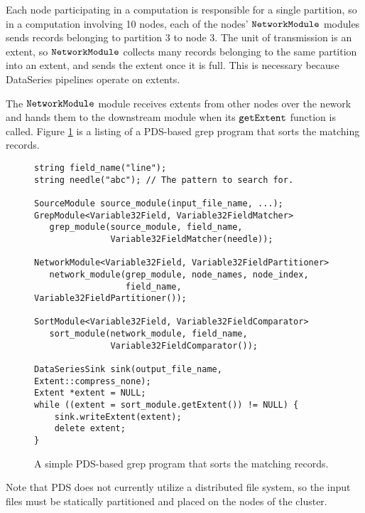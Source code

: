 \documentclass[ 11pt, letterpaper]{article}%
\begin{document}
Each node participating in a computation is responsible for a single
partition, so in a computation involving 10 nodes, each of the nodes'
$\tt NetworkModule$ modules sends records belonging to partition 3 to node 3.
The unit of transmission is an extent, so $\tt NetworkModule$ collects many
records belonging to the same partition into an extent, and sends the extent once it is
full. This is necessary because DataSeries pipelines operate on extents.

The $\tt NetworkModule$ module receives extents from other nodes over the
nework and hands them to the downstream module when its $\tt getExtent$
function is called. Figure \ref{fig:pdsexample} is a listing of a
PDS-based grep program that sorts the matching records.

\begin{figure}
\begin{center}
\begin{minipage}[htb]{13cm}
\small\singlespacing
\begin{verbatim}
string field_name("line");
string needle("abc"); // The pattern to search for.

SourceModule source_module(input_file_name, ...);
GrepModule<Variable32Field, Variable32FieldMatcher>
   grep_module(source_module, field_name,
               Variable32FieldMatcher(needle));

NetworkModule<Variable32Field, Variable32FieldPartitioner>
   network_module(grep_module, node_names, node_index,
                  field_name, Variable32FieldPartitioner());

SortModule<Variable32Field, Variable32FieldComparator>
   sort_module(network_module, field_name,
               Variable32FieldComparator());

DataSeriesSink sink(output_file_name, Extent::compress_none);
Extent *extent = NULL;
while ((extent = sort_module.getExtent()) != NULL) {
    sink.writeExtent(extent);
    delete extent;
}
\end{verbatim}
\end{minipage}
\caption{A simple PDS-based grep program that sorts the matching records.}
\label{fig:pdsexample}
\end{center}
\end{figure}

Note that PDS does not currently utilize a distributed file
system, so the input files must be statically partitioned and placed on the nodes of the cluster.
\end{document}
